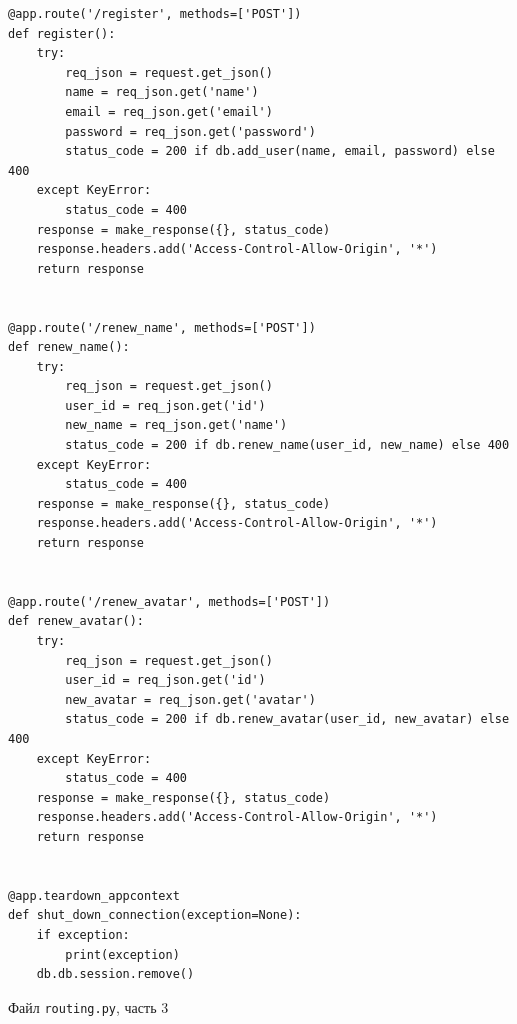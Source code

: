 \documentclass[14pt,final]{report}
\begin{document}
\begin{listing}[htbp]
\begin{center}
{\footnotesize
\begin{verbatim}
@app.route('/register', methods=['POST'])
def register():
    try:
        req_json = request.get_json()
        name = req_json.get('name')
        email = req_json.get('email')
        password = req_json.get('password')
        status_code = 200 if db.add_user(name, email, password) else 400
    except KeyError:
        status_code = 400
    response = make_response({}, status_code)
    response.headers.add('Access-Control-Allow-Origin', '*')
    return response


@app.route('/renew_name', methods=['POST'])
def renew_name():
    try:
        req_json = request.get_json()
        user_id = req_json.get('id')
        new_name = req_json.get('name')
        status_code = 200 if db.renew_name(user_id, new_name) else 400
    except KeyError:
        status_code = 400
    response = make_response({}, status_code)
    response.headers.add('Access-Control-Allow-Origin', '*')
    return response


@app.route('/renew_avatar', methods=['POST'])
def renew_avatar():
    try:
        req_json = request.get_json()
        user_id = req_json.get('id')
        new_avatar = req_json.get('avatar')
        status_code = 200 if db.renew_avatar(user_id, new_avatar) else 400
    except KeyError:
        status_code = 400
    response = make_response({}, status_code)
    response.headers.add('Access-Control-Allow-Origin', '*')
    return response


@app.teardown_appcontext
def shut_down_connection(exception=None):
    if exception:
        print(exception)
    db.db.session.remove()
\end{verbatim}}
\end{center}
\caption{Файл \texttt{routing.py}, часть 3}\label{lst:route3}
\end{listing}
\end{document}
